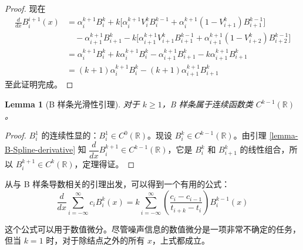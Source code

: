 \documentclass[a4paper]{article}
\newtheorem{lemma}{Lemma}
\begin{document}
\begin{proof}[Proof]
        \noindent 现在
        \begin{equation}
            \begin{aligned}
                \frac{d}{dx} B_{i}^{i+1}(x) & = \alpha_{i}^{k+1} B_{i}^{k} + k \Big[ \alpha_{i}^{k+1} V_{i}^{k} B_{i}^{k-1} + \alpha_{i}^{k+1} (1 - V_{i+1}^{k}) B_{i+1}^{k-1} \Big] \\
                & \quad - \alpha_{i+1}^{k+1} B_{i+1}^{k} - k \Big[ \alpha_{i+1}^{k+1} V_{i+1}^{k} B_{i+1}^{k-1} + \alpha_{i+1}^{k+1} (1 - V_{i+2}^{k}) B_{i+2}^{k-1} \Big] \\
                & = \alpha_{i}^{k+1} B_{i}^{k} + k \alpha_{i}^{k+1} B_{i}^{k} - \alpha_{i+1}^{k+1} B_{i+1}^{k} - k \alpha_{i+1}^{k+1} B_{i+1}^{k} \\
                & = (k+1) \alpha_{i}^{k+1} B_{i}^{k} - (k+1) \alpha_{i+1}^{k+1} B_{i+1}^{k}
            \end{aligned}
        \end{equation}
        至此证明完成。
    \end{proof}

    \begin{lemma}[B 样条光滑性引理]
        对于 $k \geqslant 1$，B 样条属于连续函数类 $C^{k-1}(\mathbb{R})$。
    \end{lemma}
    \begin{proof}[Proof]
        $B_i^1$ 的连续性显的：$B_i^1 \in C^0(\mathbb{R})$。现设 $B_i^k \in C^{k-1}(\mathbb{R})$。由引理 \ref{lemma-B-Spline-derivative} 知 $\dfrac{d}{dx} B_{i}^{k+1} \in C^{k-1}(\mathbb{R})$，它是 $B_{i}^{k}$ 和 $B_{i+1}^{k}$ 的线性组合，所以 $B_{i}^{k+1} \in C^{k}(\mathbb{R})$，定理得证。
    \end{proof}
    
    从与 B 样条导数相关的引理出发，可以得到一个有用的公式：
    \begin{equation}
    \label{expression-B-Spline-with-function-C}
        \frac{d}{dx} \sum_{i = -\infty}^{\infty} c_{i} B_{i}^{k}(x) = k \sum_{i = -\infty}^{\infty} \left(\frac{c_{i} - c_{i-1}}{t_{i+k} - t_{i}}\right) B_{i}^{k-1}(x)
    \end{equation}

    \noindent 这个公式可以用于数值微分。尽管噪声信息的数值微分是一项非常不确定的任务，但当 $k = 1$ 时，对于除结点之外的所有 $x$，上式都成立。
\end{document}
